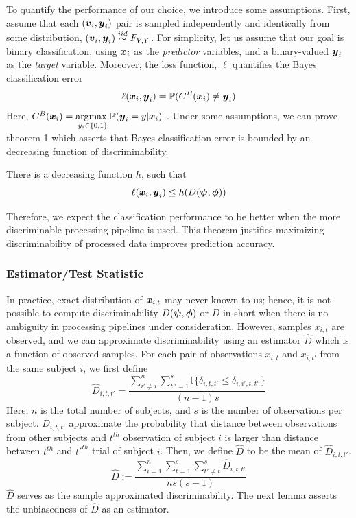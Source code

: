 \documentclass{article}
\begin{document}
To quantify the performance of our choice, we introduce some assumptions.  First, assume that each $(\boldsymbol{v}_i,\boldsymbol{y}_i)$ pair is sampled independently and identically from some distribution, $(\boldsymbol{v}_i,\boldsymbol{y}_i) \overset{iid}{\sim} F_{V,Y}$.  For simplicity, let us assume that our goal is binary classification, using $\boldsymbol{x}_i$ as the \emph{predictor} variables, and a binary-valued $\boldsymbol{y}_i$ as the \emph{target} variable. Moreover, the loss function, $\ell$ quantifies the Bayes classification error
\[\ell( \boldsymbol{x}_i, \boldsymbol{y}_i) =  \mathbb{P}(C^{B}(\boldsymbol{x}_i) \neq \boldsymbol{y}_i)\]
 Here, $C^{B}(\boldsymbol{x}_i)= \underset{y_i \in \{0,1\} }{\text{argmax }} \mathbb{P}(\boldsymbol{y}_i=y|\boldsymbol{x}_i) $ . Under some assumptions, we can prove theorem 1 which asserts that Bayes classification error is bounded by an decreasing function of discriminability. 
\begin{thm}	
	There is a decreasing function $h$, such that
\[\ell( \boldsymbol{x}_i, \boldsymbol{y}_i) \leq h(D(\boldsymbol{\psi},\boldsymbol{\phi})) \]
\end{thm}

Therefore, we expect the classification performance to be better when the more discriminable processing pipeline is used. This theorem justifies
maximizing discriminability of processed data improves prediction accuracy.

\subsubsection{Estimator/Test Statistic}
In practice, exact distribution of $\boldsymbol{x}_{i,t}$ may never known to us; hence, it is not possible to compute discriminability $D(\boldsymbol{\psi},\boldsymbol{\phi})$ or $D$ in short when there is no ambiguity in processing pipelines under consideration. However, samples $x_{i,t}$ are observed, and we can approximate discriminability using an estimator $\hat{D}$ which is a function of observed samples. For each pair of observations $x_{i,t}$ and $x_{i,t'}$ from the same subject $i$, we first define
\[ \hat{D}_{i,t,t'} = \frac{\sum\limits_{i' \neq i}^{n} \sum\limits_{t''=1}^{s} \mathbb{I}\{\delta_{i,t,t'} \leq \delta_{i,i',t,t''} \} }{(n-1)s}\]
Here, $n$ is the total number of subjects, and $s$ is the number of observations per subject. $\hat{D}_{i,t,t'}$ approximate the probability that distance between observations from other subjects and $t^{th}$ observation of subject $i$ is larger than distance between $t^{th}$ and $t'^{th}$ trial of subject $i$. Then, we define $\hat{D}$ to be the mean of $\hat{D}_{i,t,t'}$.
\[ \hat{D} := \frac{\sum\limits_{i=1}^{n} \sum\limits_{t=1}^{s}  \sum\limits_{t' \neq t}^{s} \hat{D}_{i,t,t'}}{ns(s-1)} \]
$\hat{D}$ serves as the sample approximated discriminability. The next lemma asserts the unbiasedness of $\hat{D}$ as an estimator.
\end{document}
